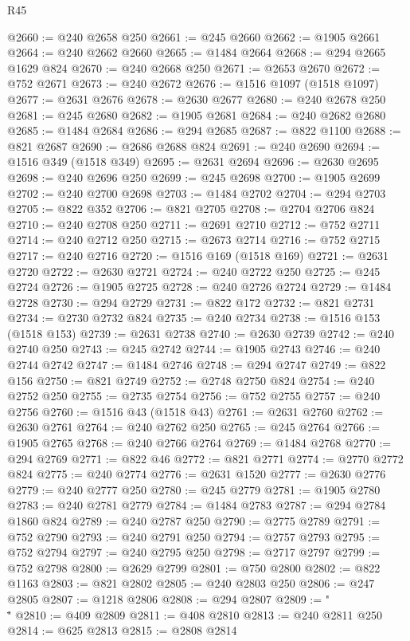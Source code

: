 \begin{lexlean}{R45}
\begin{coremodule}
{@2660 := @240 @2658 @250
@2661 := @245 @2660
@2662 := @1905 @2661
@2664 := @240 @2662 @2660
@2665 := @1484 @2664
@2668 := @294 @2665 @1629 @824
@2670 := @240 @2668 @250
@2671 := @2653 @2670
@2672 := @752 @2671
@2673 := @240 @2672
@2676 := @1516 @1097 (@1518 @1097)
@2677 := @2631 @2676
@2678 := @2630 @2677
@2680 := @240 @2678 @250
@2681 := @245 @2680
@2682 := @1905 @2681
@2684 := @240 @2682 @2680
@2685 := @1484 @2684
@2686 := @294 @2685
@2687 := @822 @1100
@2688 := @821 @2687
@2690 := @2686 @2688 @824
@2691 := @240 @2690
@2694 := @1516 @349 (@1518 @349)
@2695 := @2631 @2694
@2696 := @2630 @2695
@2698 := @240 @2696 @250
@2699 := @245 @2698
@2700 := @1905 @2699
@2702 := @240 @2700 @2698
@2703 := @1484 @2702
@2704 := @294 @2703
@2705 := @822 @352
@2706 := @821 @2705
@2708 := @2704 @2706 @824
@2710 := @240 @2708 @250
@2711 := @2691 @2710
@2712 := @752 @2711
@2714 := @240 @2712 @250
@2715 := @2673 @2714
@2716 := @752 @2715
@2717 := @240 @2716
@2720 := @1516 @169 (@1518 @169)
@2721 := @2631 @2720
@2722 := @2630 @2721
@2724 := @240 @2722 @250
@2725 := @245 @2724
@2726 := @1905 @2725
@2728 := @240 @2726 @2724
@2729 := @1484 @2728
@2730 := @294 @2729
@2731 := @822 @172
@2732 := @821 @2731
@2734 := @2730 @2732 @824
@2735 := @240 @2734
@2738 := @1516 @153 (@1518 @153)
@2739 := @2631 @2738
@2740 := @2630 @2739
@2742 := @240 @2740 @250
@2743 := @245 @2742
@2744 := @1905 @2743
@2746 := @240 @2744 @2742
@2747 := @1484 @2746
@2748 := @294 @2747
@2749 := @822 @156
@2750 := @821 @2749
@2752 := @2748 @2750 @824
@2754 := @240 @2752 @250
@2755 := @2735 @2754
@2756 := @752 @2755
@2757 := @240 @2756
@2760 := @1516 @43 (@1518 @43)
@2761 := @2631 @2760
@2762 := @2630 @2761
@2764 := @240 @2762 @250
@2765 := @245 @2764
@2766 := @1905 @2765
@2768 := @240 @2766 @2764
@2769 := @1484 @2768
@2770 := @294 @2769
@2771 := @822 @46
@2772 := @821 @2771
@2774 := @2770 @2772 @824
@2775 := @240 @2774
@2776 := @2631 @1520
@2777 := @2630 @2776
@2779 := @240 @2777 @250
@2780 := @245 @2779
@2781 := @1905 @2780
@2783 := @240 @2781 @2779
@2784 := @1484 @2783
@2787 := @294 @2784 @1860 @824
@2789 := @240 @2787 @250
@2790 := @2775 @2789
@2791 := @752 @2790
@2793 := @240 @2791 @250
@2794 := @2757 @2793
@2795 := @752 @2794
@2797 := @240 @2795 @250
@2798 := @2717 @2797
@2799 := @752 @2798
@2800 := @2629 @2799
@2801 := @750 @2800
@2802 := @822 @1163
@2803 := @821 @2802
@2805 := @240 @2803 @250
@2806 := @247 @2805
@2807 := @1218 @2806
@2808 := @294 @2807
@2809 := "\\\""
@2810 := @409 @2809
@2811 := @408 @2810
@2813 := @240 @2811 @250
@2814 := @625 @2813
@2815 := @2808 @2814
}
\end{coremodule}
\end{lexlean}
